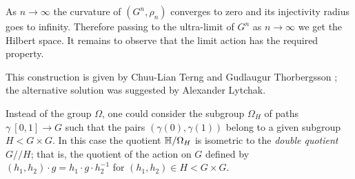 As $n\to\infty$ the curvature of $(G^n,\rho_n)$ converges to zero and its injectivity radius goes to infinity.
Therefore passing to the ultra-limit of $G^n$ as $n\to\infty$ we get the Hilbert space.
It remains to observe that the limit action has the required property.
\qeds

This construction is given by Chuu-Lian Terng and Gudlaugur Thorbergsson \cite[see section 4 in][]{terng-thorbergsson};
the alternative solution was suggested by Alexander Lytchak.

Instead of the group $\Omega$, 
one could consider the subgroup $\Omega_H$ of paths $\gamma\:[0,1]\to G$ such that the pairs $(\gamma(0),\gamma(1))$ belong to a given subgroup $H<G\times G$.
In this case the quotient $\mathbb{H}/\Omega_H$ is isometric to the \emph{double quotient} $G/\!\!/H$;
that is, the quotient of the action on $G$ defined by $(h_1,h_2)\cdot g=h_1\cdot g\cdot h_2^{-1}$ for $(h_1,h_2)\in H<G\times G$.